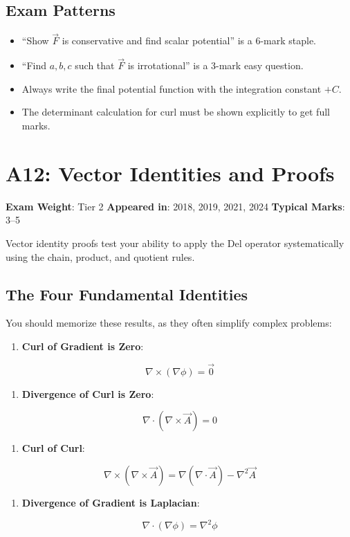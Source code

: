 \documentclass[
]{article}
\providecommand{\tightlist}{%
  \setlength{\itemsep}{0pt}\setlength{\parskip}{0pt}}
\renewenvironment{quote}
  {\begin{tcolorbox}[
     colback=calloutbg,
     colframe=calloutframe,
     colupper=callouttext,
     arc=3pt,
     boxrule=0.5pt,
     leftrule=0.5pt,
     borderline west={3pt}{0pt}{calloutaccent},
     left=8pt,
     right=8pt,
     top=6pt,
     bottom=6pt
   ]}
  {\end{tcolorbox}}
\begin{document}
\subsection{Exam Patterns}\label{exam-patterns-9}

\begin{itemize}
\tightlist
\item
  ``Show \(\vec{F}\) is conservative and find scalar potential'' is a
  6-mark staple.
\item
  ``Find \(a, b, c\) such that \(\vec{F}\) is irrotational'' is a 3-mark
  easy question.
\item
  Always write the final potential function with the integration
  constant \(+ C\).
\item
  The determinant calculation for curl must be shown explicitly to get
  full marks.
\end{itemize}

\section{A12: Vector Identities and
Proofs}\label{a12-vector-identities-and-proofs}

\begin{quote}
\textbf{Exam Weight}: Tier 2 \textbar{} \textbf{Appeared in}: 2018,
2019, 2021, 2024 \textbar{} \textbf{Typical Marks}: 3--5
\end{quote}

Vector identity proofs test your ability to apply the Del operator
systematically using the chain, product, and quotient rules.

\subsection{The Four Fundamental
Identities}\label{the-four-fundamental-identities}

You should memorize these results, as they often simplify complex
problems:

\begin{enumerate}
\def\labelenumi{\arabic{enumi}.}
\tightlist
\item
  \textbf{Curl of Gradient is Zero}:
\end{enumerate}
\[
\nabla \times (\nabla\phi) = \vec{0}
\]
\begin{enumerate}
\def\labelenumi{\arabic{enumi}.}
\setcounter{enumi}{1}
\tightlist
\item
  \textbf{Divergence of Curl is Zero}:
\end{enumerate}
\[
\nabla \cdot (\nabla \times \vec{A}) = 0
\]
\begin{enumerate}
\def\labelenumi{\arabic{enumi}.}
\setcounter{enumi}{2}
\tightlist
\item
  \textbf{Curl of Curl}:
\end{enumerate}
\[
\nabla \times (\nabla \times \vec{A}) = \nabla(\nabla \cdot \vec{A}) - \nabla^2\vec{A}
\]
\begin{enumerate}
\def\labelenumi{\arabic{enumi}.}
\setcounter{enumi}{3}
\tightlist
\item
  \textbf{Divergence of Gradient is Laplacian}:
\end{enumerate}
\[
\nabla \cdot (\nabla\phi) = \nabla^2\phi
\]
\end{document}
